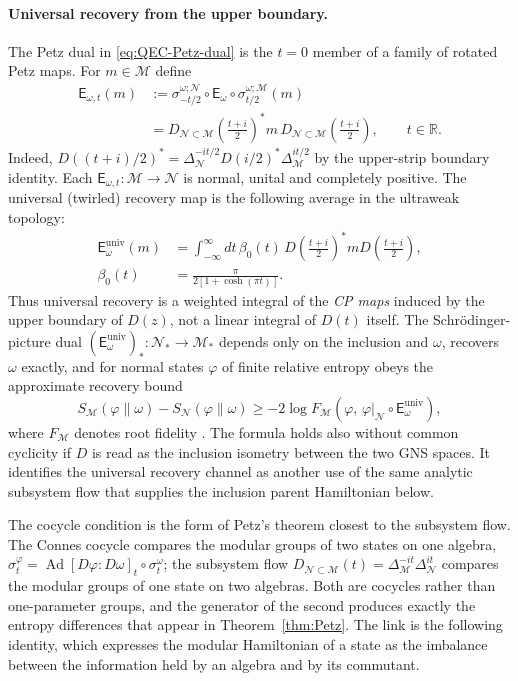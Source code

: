 \documentclass[a4paper,11pt]{article}
\theoremstyle{definition}
\newcommand{\nn}{\nonumber}
\newcommand{\mN}{\mathcal{N}}
\newcommand{\mM}{\mathcal{M}}
\begin{document}
\paragraph{Universal recovery from the upper boundary.}
The Petz dual in \eqref{eq:QEC-Petz-dual} is the $t=0$ member of a family
of rotated Petz maps. For $m\in\mM$ define
\begin{align}
 \mathsf E_{\omega,t}(m)
 &:=\sigma_{-t/2}^{\omega;\mN}
 \!\circ\mathsf E_\omega\circ
 \sigma_{t/2}^{\omega;\mM}(m)\nn\\
 &=D_{\mN\subset\mM}\!\left(\frac{t+i}{2}\right)^*
 m\,D_{\mN\subset\mM}\!\left(\frac{t+i}{2}\right),
 \qquad t\in\mathbb R.
 \label{eq:rotated-Petz-D}
\end{align}
Indeed, $D((t+i)/2)^*=\Delta_{\mN}^{-it/2}
D(i/2)^*\Delta_{\mM}^{it/2}$ by the upper-strip boundary
identity. Each $\mathsf E_{\omega,t}:\mM\to\mN$ is normal, unital
and completely positive. The universal (twirled) recovery map is the
following average in the ultraweak topology:
\begin{align}
 \mathsf E_\omega^{\mathrm{univ}}(m)
 &=\int_{-\infty}^{\infty}\!dt\,\beta_0(t)\,
 D\!\left(\frac{t+i}{2}\right)^*m
 D\!\left(\frac{t+i}{2}\right),\nn\\
 \beta_0(t)&=\frac{\pi}{2[1+\cosh(\pi t)]}.
 \label{eq:universal-recovery-D}
\end{align}
Thus universal recovery is a weighted integral of the \emph{CP maps}
induced by the upper boundary of $D(z)$, not a linear integral of
$D(t)$ itself. The Schr\"odinger-picture dual
$(\mathsf E_\omega^{\mathrm{univ}})_*:\mN_*\to\mM_*$ depends only
on the inclusion and $\omega$, recovers $\omega$ exactly, and for
normal states $\varphi$ of finite relative entropy obeys the
approximate recovery bound
\begin{equation}
 S_{\mM}(\varphi\|\omega)-S_{\mN}(\varphi\|\omega)
 \geq -2\log F_{\mM}\!\left(
 \varphi,\,\varphi|_{\mN}\circ
 \mathsf E_\omega^{\mathrm{univ}}\right),
 \label{eq:universal-recovery-bound}
\end{equation}
where $F_{\mM}$ denotes root fidelity
\cite{JungeRennerSutterWildeWinter2018,FaulknerHollandsSwingleWang2022}.
The formula holds also without common cyclicity if $D$ is read as the
inclusion isometry between the two GNS spaces. It identifies the
universal recovery channel as another use of the same analytic
subsystem flow that supplies the inclusion parent Hamiltonian below.

The cocycle condition is the form of Petz's theorem closest to the subsystem flow. The Connes cocycle compares the modular groups of two states on one algebra, $\sigma^{\varphi}_t=\operatorname{Ad}[D\varphi:D\omega]_t\circ\sigma^{\omega}_t$; the subsystem flow $D_{\mN\subset\mM}(t)=\Delta_{\mM}^{-it}\Delta_{\mN}^{it}$ compares the modular groups of one state on two algebras. Both are cocycles rather than one-parameter groups, and the generator of the second produces exactly the entropy differences that appear in Theorem~\ref{thm:Petz}. The link is the following identity, which expresses the modular Hamiltonian of a state as the imbalance between the information held by an algebra and by its commutant.
\end{document}
